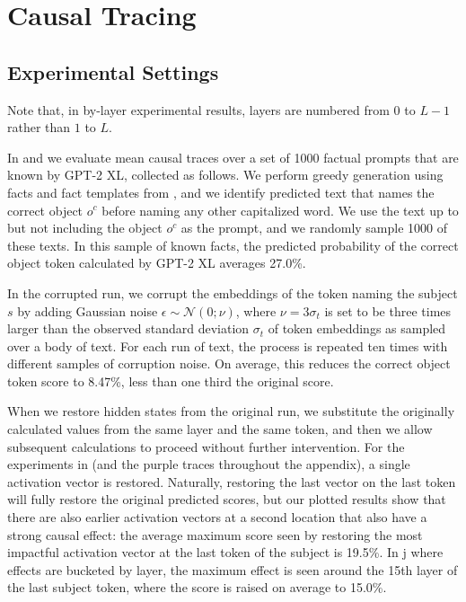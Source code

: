 \section{Causal Tracing}
\label{apd:causal-tracing}

\subsection{Experimental Settings}
\label{apd:causal-tracing-details}

Note that, in by-layer experimental results, layers  are numbered from 0 to $L-1$ rather than $1$ to $L$.

In  and  we evaluate mean causal traces over a set of 1000 factual prompts that are known by GPT-2 XL, collected as follows.  We perform greedy generation using facts and fact templates from \cfd, and we identify predicted text that names the correct object $o^c$ before naming any other capitalized word.  We use the text up to but not including the object $o^c$ as the prompt, and we randomly sample 1000 of these texts.  In this sample of known facts, the predicted probability of the correct object token calculated by GPT-2 XL averages 27.0\%.

In the corrupted run, we corrupt the embeddings of the token naming the subject $s$ by adding Gaussian noise $\epsilon \sim \mathcal{N}(0; \nu)$, where $\nu = 3\sigma_t$ is set to be three times larger than the observed standard deviation $\sigma_t$ of token embeddings as sampled over a body of text.
For each run of text, the process is repeated ten times with different samples of corruption noise.  On average, this reduces the correct object token score to 8.47\%, less than one third the original score.

When we restore hidden states from the original run, we substitute the originally calculated values from the same layer and the same token, and then we allow subsequent calculations to proceed without further intervention.  For the experiments in  (and the purple traces throughout the appendix), a single activation vector is restored.  Naturally, restoring the last vector on the last token will fully restore the original predicted scores, but our plotted results show that there are also earlier activation vectors at a second location that also have a strong causal effect: the average maximum score seen by restoring the most impactful activation vector at the last token of the subject is 19.5\%.  In j where effects are bucketed by layer, the maximum effect is seen around the 15th layer of the last subject token, where the score is raised on average to 15.0\%.


